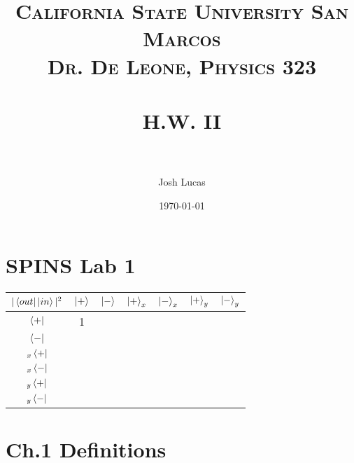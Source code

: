 \documentclass[paper=a4, fontsize=11pt]{scrartcl} %
\title{	
\normalfont \normalsize 
\textsc{California State University San Marcos \\ Dr. De Leone, Physics 323} \\ [25pt] %
\horrule{0.5pt} \\[0.4cm] %
\huge H.W. II \\ %
\horrule{2pt} \\[0.5cm] %
}
\author{Josh Lucas} %
\date{\normalsize\today} %
\numberwithin{equation}{section} %
\numberwithin{figure}{section} %
\numberwithin{table}{section} %
\begin{document}
\maketitle %


\section{SPINS Lab 1}
\begin{center}
  \begin{tabular}{ | c | c | c | c | c | c | c | }
    \hline
    $|\bra{out}\ket{in}|^2$ & $\ket{+}$& $\ket{-}$ & $\ket{+}_x$ & $\ket{-}_x$ & $\ket{+}_y$ & $\ket{-}_y$ \\ \hline
  $  \bra{+}$ & 1 &   &  &  &  &    \\ \hline
    $\bra{-}$ &  &  &  &  &  &   \\
    \hline
       $_x\bra{+}$ &  &  &  &  &  &   \\
    \hline
       $_x\bra{-}$ &  &  &  &  &  &   \\
    \hline
       $_y\bra{+}$ &  &  &  &  &  &   \\
    \hline
       $_y\bra{-}$ &  &  &  &  &  &   \\
    \hline
  \end{tabular}
\end{center}
\section{Ch.1 Definitions}


\end{document}
